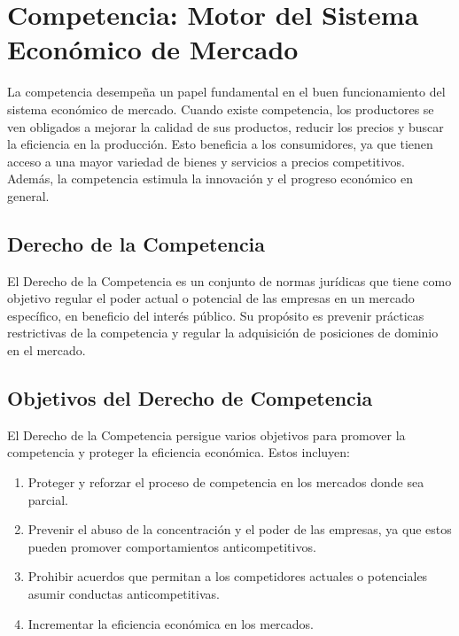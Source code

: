 \documentclass[
  doc,
  floatsintext,
  longtable,
  a4paper,
  nolmodern,
  notxfonts,
  notimes,
  12pt,
  colorlinks=true,linkcolor=blue,citecolor=blue,urlcolor=blue]{apa7}
\providecommand{\tightlist}{%
  \setlength{\itemsep}{0pt}\setlength{\parskip}{0pt}}
\begin{document}
\section{Competencia: Motor del Sistema Económico de
Mercado}\label{competencia-motor-del-sistema-econuxf3mico-de-mercado}

La competencia desempeña un papel fundamental en el buen funcionamiento
del sistema económico de mercado. Cuando existe competencia, los
productores se ven obligados a mejorar la calidad de sus productos,
reducir los precios y buscar la eficiencia en la producción. Esto
beneficia a los consumidores, ya que tienen acceso a una mayor variedad
de bienes y servicios a precios competitivos. Además, la competencia
estimula la innovación y el progreso económico en general.

\subsection{Derecho de la Competencia}\label{derecho-de-la-competencia}

El Derecho de la Competencia es un conjunto de normas jurídicas que
tiene como objetivo regular el poder actual o potencial de las empresas
en un mercado específico, en beneficio del interés público. Su propósito
es prevenir prácticas restrictivas de la competencia y regular la
adquisición de posiciones de dominio en el mercado.

\subsection{Objetivos del Derecho de
Competencia}\label{objetivos-del-derecho-de-competencia}

El Derecho de la Competencia persigue varios objetivos para promover la
competencia y proteger la eficiencia económica. Estos incluyen:

\begin{enumerate}
\def\labelenumi{\arabic{enumi}.}
\tightlist
\item
  Proteger y reforzar el proceso de competencia en los mercados donde
  sea parcial.
\item
  Prevenir el abuso de la concentración y el poder de las empresas, ya
  que estos pueden promover comportamientos anticompetitivos.
\item
  Prohibir acuerdos que permitan a los competidores actuales o
  potenciales asumir conductas anticompetitivas.
\item
  Incrementar la eficiencia económica en los mercados.
\end{enumerate}
\end{document}
